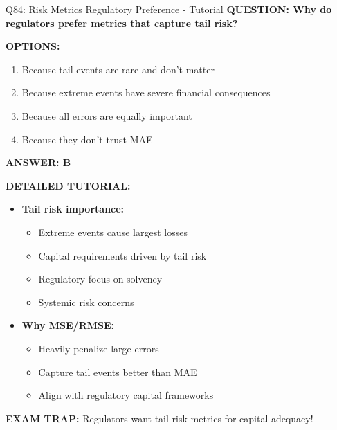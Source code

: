 \documentclass[8pt]{beamer}
\begin{document}
\begin{frame}{Q84: Risk Metrics Regulatory Preference - Tutorial}
	\fontsize{6.5}{7.5}\selectfont
	\textbf{QUESTION: Why do regulators prefer metrics that capture tail risk?}
	
	\vspace{0.1cm}
	\textbf{OPTIONS:}
	\begin{enumerate}
		\item Because tail events are rare and don't matter
		\item Because extreme events have severe financial consequences
		\item Because all errors are equally important
		\item Because they don't trust MAE
	\end{enumerate}
	
	\vspace{0.1cm}
	\textcolor{myblue}{\textbf{ANSWER: B}}
	
	\vspace{0.1cm}
	\textbf{DETAILED TUTORIAL:}
	\begin{itemize}
		\item \textbf{Tail risk importance:}
		\begin{itemize}
			\item Extreme events cause largest losses
			\item Capital requirements driven by tail risk
			\item Regulatory focus on solvency
			\item Systemic risk concerns
		\end{itemize}
		\item \textbf{Why MSE/RMSE:}
		\begin{itemize}
			\item Heavily penalize large errors
			\item Capture tail events better than MAE
			\item Align with regulatory capital frameworks
		\end{itemize}
	\end{itemize}
	
	\textcolor{myred}{\textbf{EXAM TRAP:}} Regulators want \textcolor{myblue}{tail-risk metrics} for capital adequacy!
\end{frame}
\end{document}
